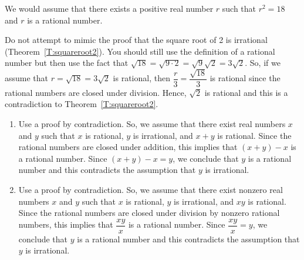 \begin{list}{\bf{\ref{exer:sec33-2}.}}
\item \begin{list}{\bf{(a)}}
\item We would assume that there exists a positive real number $r$  such that $r^2 = 18$ and $r$ is a rational number.
\end{list}
\end{list}

\begin{list}{}
\item \begin{list}{\bf{(b)}}
\item Do not attempt to mimic the proof that the square root of 2 is irrational 
(Theorem~\ref{T:squareroot2}).  You should still use the definition of a rational number but then use the fact that  $\sqrt {18}  = \sqrt {9 \cdot 2}  = \sqrt 9 \sqrt 2  = 3\sqrt 2 $.  So, if we assume that $r = \sqrt{18} = 3 \sqrt{2}$ is rational, then $\dfrac{r}{3} = \dfrac{\sqrt{18}}{3}$ is rational since the rational numbers are closed under division.  Hence, $\sqrt{2}$ is rational and this is a contradiction to Theorem~\ref{T:squareroot2}.
\end{list}
\end{list}


\begin{list}{\bf{\ref{exer:sec33-3}.}}
\item \begin{enumerate}
\item Use a proof by contradiction.  So, we assume that there exist real numbers $x$ and $y$ such that $x$ is rational, $y$ is irrational, and $x + y$ is rational.  Since the rational numbers are closed under addition, this implies that $\left( x + y \right) - x$ is a rational number.  Since $\left( x + y \right) - x = y$, we conclude that $y$ is a rational number and this contradicts the assumption that $y$ is irrational.

\item Use a proof by contradiction.  So, we assume that there exist nonzero real numbers $x$ and $y$ such that $x$ is rational, $y$ is irrational, and $xy$ is rational.  Since the rational numbers are closed under division by nonzero rational numbers, this implies that 
$\dfrac{xy}{x}$ is a rational number.  Since $\dfrac{xy}{x} = y$, we conclude that $y$ is a rational number and this contradicts the assumption that $y$ is irrational.
\end{enumerate}
\end{list}

